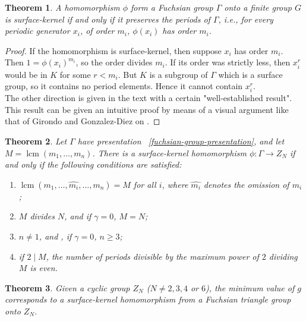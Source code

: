 \documentclass[reqno]{amsart}
\newtheorem{theorem}{Theorem}[section]
\theoremstyle{definition}
\theoremstyle{remark}
\DeclareMathOperator{\lcm}{lcm}
\begin{document}
\begin{theorem}
    A homomorphism 
    $\phi$ form a Fuchsian group $\Gamma$ onto
    a finite group $G$ is surface-kernel if and only if it preserves the periods of $\Gamma$,
    i.e., for every periodic generator
    $x_i$, of order
    $m_i$, $\phi (x_i)$ has
    order $m_i$.
\end{theorem}

\begin{proof}
    If the homomorphism is surface-kernel, then
    suppose $x_i$ has
    order $m_i$. Then
    $1 = \phi(x_i)^{m_i}$,
    so the order divides $m_i$. If its order was
    strictly less, then
    $x_i^r$ would be in $K$
    for some $r < m_i$. But
    $K$ is a subgroup of 
    $\Gamma$ which
    is a surface group, so
    it contains no period
    elements. Hence
    it cannot contain $x_i^r$.\\
    \linebreak
    The other direction is given in the text with a certain "well-established result". This result can be given an intuitive proof by means of a visual argument like that of Girondo and Gonzalez-Diez on \cite[p~118-119]{Girondo-Gonzalez-Diez}.
\end{proof}

\begin{theorem}
    Let $\Gamma$ have presentation ~\ref{fuchsian-group-presentation}, and
    let $M = 
    \lcm (m_1, \ldots, m_n)$.
    There is a surface-kernel
    homomorphism
    $\phi \colon \Gamma
    \to Z_N$ if and only
    if the following conditions are satisfied:
    \begin{enumerate}
        \item 
        $\lcm(m_1, \ldots,
        \hat{m_i}, \ldots
        , m_n) = M$ for
        all $i$, where
        $\hat{m_i}$ denotes
        the omission of $m_i$;
        \item $M$ divides
        $N$, and if
        $\gamma = 0$, 
        $M = N$;
        \item $n\neq 1$, and
        , if $\gamma = 0$,
        $n \geq 3$;
        \item if $2 \mid M$,
        the number of periods divisible by the maximum power of $2$ dividing $M$ is even.
    \end{enumerate}
\end{theorem}


\begin{theorem}
    Given a cyclic group $Z_N$ ($N \neq 2,3,4$ or $6$), the minimum value of $g$ corresponds to a surface-kernel homomorphism from a Fuchsian triangle group onto $Z_N$.
\end{theorem} 
\end{document}

